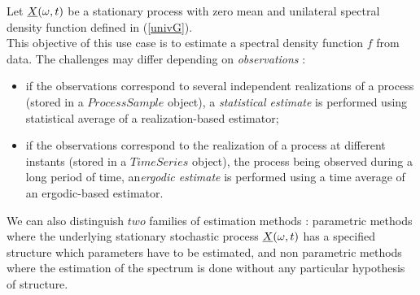 \renewcommand{\filename}{docUC_StocProc_SpectralModel_Estimation.tex}
\renewcommand{\filetitle}{UC : Estimation of a spectral model}

\HeaderIIILevel



Let ${\underline{X}}(\omega,t)$ be a stationary process with zero mean and unilateral spectral density function defined in (\ref{univG}).\\

This objective of this use case is to estimate a spectral density function $f$ from data. The challenges may differ depending on \emph{observations} :

\begin{itemize}
 \item if the observations correspond to  several independent  realizations of a  process (stored in a $ProcessSample$ object), a \emph{statistical estimate} is performed using statistical average of a realization-based estimator;
 \item if the observations correspond to the realization of a  process  at different instants (stored in a  $TimeSeries$ object), the process being observed during a long period of time, an\emph{ergodic estimate} is performed using a time average of an ergodic-based estimator.
\end{itemize}
 
We can also distinguish $two$ families of estimation methods : parametric methods where the underlying stationary stochastic process ${\underline{X}}(\omega,t)$ has a specified structure which parameters have to be estimated, and  non parametric methods where the estimation of the spectrum is done without any particular hypothesis of structure.\\

